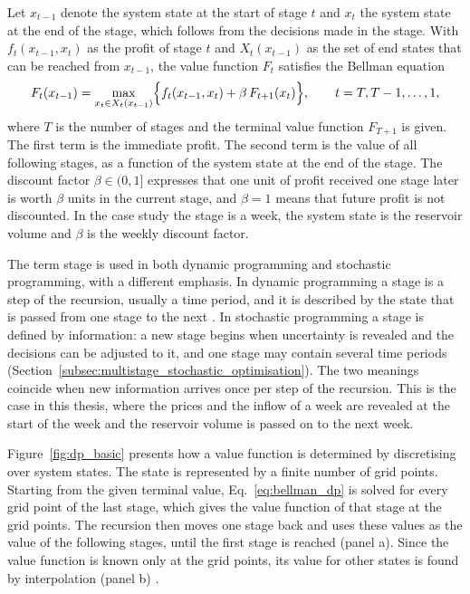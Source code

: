 Let $x_{t-1}$ denote the system state at the start of stage $t$ and $x_t$ the system state at the end of the stage, which follows from the decisions made in the stage. With $f_t(x_{t-1},x_t)$ as the profit of stage $t$ and $X_t(x_{t-1})$ as the set of end states that can be reached from $x_{t-1}$, the value function $F_t$ satisfies the Bellman equation
\begin{equation}
F_t(x_{t-1})=\max_{x_t\in X_t(x_{t-1})}\Bigl\{f_t(x_{t-1},x_t)+\beta\,F_{t+1}(x_t)\Bigr\},
\qquad t=T,T-1,\ldots,1,
\label{eq:bellman_dp}
\end{equation}
where $T$ is the number of stages and the terminal value function $F_{T+1}$ is given. The first term is the immediate profit. The second term is the value of all following stages, as a function of the system state at the end of the stage. The discount factor $\beta\in(0,1]$ expresses that one unit of profit received one stage later is worth $\beta$ units in the current stage, and $\beta=1$ means that future profit is not discounted. In the case study the stage is a week, the system state is the reservoir volume and $\beta$ is the weekly discount factor.

The term stage is used in both dynamic programming and stochastic programming, with a different emphasis. In dynamic programming a stage is a step of the recursion, usually a time period, and it is described by the state that is passed from one stage to the next \parencite[p.~99]{labadie2004}. In stochastic programming a stage is defined by information: a new stage begins when uncertainty is revealed and the decisions can be adjusted to it, and one stage may contain several time periods (Section~\ref{subsec:multistage_stochastic_optimisation}). The two meanings coincide when new information arrives once per step of the recursion. This is the case in this thesis, where the prices and the inflow of a week are revealed at the start of the week and the reservoir volume is passed on to the next week.

Figure~\ref{fig:dp_basic} presents how a value function is determined by discretising over system states. The state is represented by a finite number of grid points. Starting from the given terminal value, Eq.~\eqref{eq:bellman_dp} is solved for every grid point of the last stage, which gives the value function of that stage at the grid points. The recursion then moves one stage back and uses these values as the value of the following stages, until the first stage is reached (panel a). Since the value function is known only at the grid points, its value for other states is found by interpolation (panel b) \parencite[p.~360]{pereiraPinto1991}.

